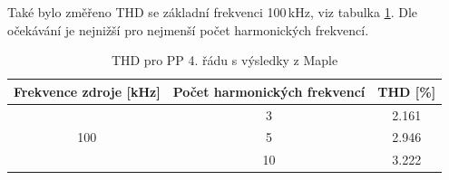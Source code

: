 \noindent Také bylo změřeno THD se základní frekvenci 100\,kHz, viz tabulka \ref{s:THD333}. Dle očekávání je nejnižší pro nejmenší počet harmonických frekvencí.
\begin{table}[h]
\centering
\renewcommand{\arraystretch}{1.15}
  \begin{tabular}{ | c | c | c |}
    \hline
    Frekvence zdroje [kHz] & Počet harmonických frekvencí & THD [\%] \\ \hline
	\multirow{3}{*}{100} & 3 & 2.161\\& 5 & 2.946 \\& 10 & 3.222 \\ \hline
  \end{tabular}
  \caption[THD pro PP 4. řádu (Maple)]{THD pro PP 4. řádu s výsledky z Maple \label{s:THD333}}
\end{table}